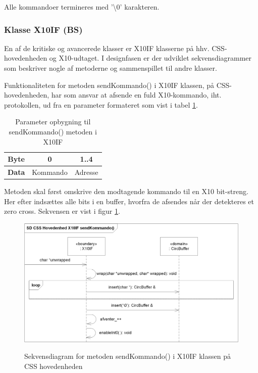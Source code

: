 Alle kommandoer termineres med '\textbackslash 0' karakteren. 

\subsubsection{Klasse X10IF (BS)}
En af de kritiske og avancerede klasser er X10IF klasserne på hhv. CSS-hovedenheden og X10-udtaget. I designfasen er der udviklet sekvensdiagrammer som beskriver nogle af metoderne og sammenspillet til andre klasser.

Funktionaliteten for metoden sendKommando() i X10IF klassen, på CSS-hovedenheden, har som ansvar at afsende en fuld X10-kommando, iht. protokollen, ud fra en parameter formateret som vist i tabel \ref{table:X10_sendKommando_format}.

\begin{table}[h]
	\caption{Parameter opbygning til sendKommando() metoden i X10IF}
	\centering
	\begin{tabular}{|c|c|c|}
		\hline 
		\textbf{Byte} & 0 & 1..4 \\ \hline
		\textbf{Data} & Kommando & Adresse \\ 
		\hline 
	\end{tabular} 
	\label{table:X10_sendKommando_format}
\end{table}

Metoden skal først omskrive den modtagende kommando til en X10 bit-streng. Her efter indsættes alle bits i en buffer, hvorfra de afsendes når der detekteres et zero cross. 
Sekvensen er vist i figur \ref{fig:X10_sendKommando_sd}.

\begin{figure}[!htb]
     {\includegraphics[width=\textwidth]{billeder/uml/CSS_X10IF_sendKommando_SD}}
     \caption{Sekvensdiagram for metoden sendKommando() i X10IF klassen på CSS hovedenheden}
     \label{fig:X10_sendKommando_sd}
\end{figure}

